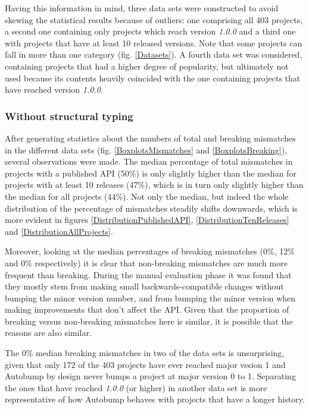 \documentclass{l4proj}
\begin{document}
Having this information in mind, three data sets were constructed to
avoid skewing the statistical results because of outliers: one
comprising all 403 projects, a second one containing only projects
which reach version \textit{1.0.0} and a third one with projects that
have at least 10 released versions. Note that some projects can fall
in more than one category (fig. \ref{Datasets}). A fourth data set was
considered, containing projects that had a higher degree of
popularity, but ultimately not used because its contents heavily
coincided with the one containing projects that have reached version
\textit{1.0.0}.

\subsubsection{Without structural typing}

After generating statistics about the numbers of total and breaking
mismatches in the different data sets (fig. \ref{BoxplotsMismatches}
and \ref{BoxplotsBreaking}), several observations were made. The
median percentage of total mismatches in projects with a published API
(50\%) is only slightly higher than the median for projects with at
least 10 releases (47\%), which is in turn only slightly higher than
the median for all projects (44\%). Not only the median, but indeed
the whole distribution of the percentage of mismatches steadily shifts
downwards, which is more evident in figures
\ref{DistributionPublishedAPI}, \ref{DistributionTenReleases} and
\ref{DistributionAllProjects}.

Moreover, looking at the median percentages of breaking mismatches
(0\%, 12\% and 0\% respectively) it is clear that non-breaking
mismatches are much more frequent than breaking. During the manual
evaluation phase it was found that they mostly stem from making small
backwards-compatible changes without bumping the minor version number,
and from bumping the minor version when making improvements that don't
affect the API. Given that the proportion of breaking versus
non-breaking mismatches here is similar, it is possible that the
reasons are also similar.

The 0\% median breaking mismatches in two of the data sets is
unsurprising, given that only 172 of the 403 projects have ever
reached major vesion 1 and Autobump by design never bumps a project at
major version 0 to 1. Separating the ones that have reached
\textit{1.0.0} (or higher) in another data set is more representative
of how Autobump behaves with projects that have a longer history.
\end{document}
